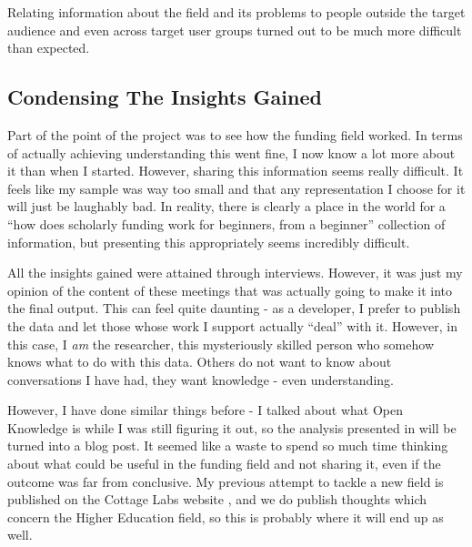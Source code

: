 
Relating information about the field and its problems to people outside the target audience and even across target user groups turned out to be much more difficult than expected.

\subsection{Condensing The Insights Gained}
Part of the point of the project was to see how the funding field worked. In terms of actually achieving understanding this went fine, I now know a lot more about it than when I started. However, sharing this information seems really difficult. It feels like my sample was way too small and that any representation I choose for it will just be laughably bad. In reality, there is clearly a place in the world for a ``how does scholarly funding work for beginners, from a beginner'' collection of information, but presenting this appropriately seems incredibly difficult.

All the insights gained were attained through interviews. However, it was just my opinion of the content of these meetings that was actually going to make it into the final output. This can feel quite daunting - as a developer, I prefer to publish the data and let those whose work I support actually ``deal'' with it. However, in this case, I \emph{am} the researcher, this mysteriously skilled person who somehow knows what to do with this data. Others do not want to know about conversations I have had, they want knowledge - even understanding.

However, I have done similar things before - I talked about what Open Knowledge is while I was still figuring it out, so the analysis presented in  will be turned into a blog post. It seemed like a waste to spend so much time thinking about what could be useful in the funding field and not sharing it, even if the outcome was far from conclusive. My previous attempt to tackle a new field is published on the Cottage Labs website \cite{cl-emanuil-beginner-pov}, and we do publish thoughts which concern the Higher Education field, so this is probably where it will end up as well.

